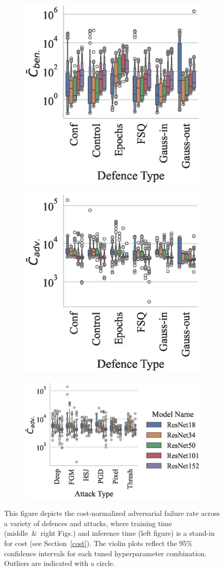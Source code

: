\begin{figure}[!h]
    \centering
    \begin{subfigure}
        \centering
        \includegraphics[width=.28\textwidth]{mnist/ben_failures_per_train_time_vs_defence_type.eps}
    \end{subfigure}
    \begin{subfigure}
        \centering
        \includegraphics[width=.28\textwidth]{mnist/adv_failures_per_train_time_vs_defence_type.eps}
    \end{subfigure}
    \begin{subfigure}
        \centering
        \includegraphics[width=.41\textwidth]{mnist/adv_failures_per_train_time_vs_attack_type.eps}
    \end{subfigure}
    \caption{This figure depicts the cost-normalized adversarial failure rate across a variety of defences and attacks, where training time (middle~\&~right Figs.) and inference time (left figure) is a stand-in for cost (see Section~\ref{cost}). The violin plots reflect the 95\% confidence intervals for each tuned hyperparameter combination. Outliers are indicated with a circle.}
    \label{fig:mnist_failures_per_train_time}
\end{figure}

